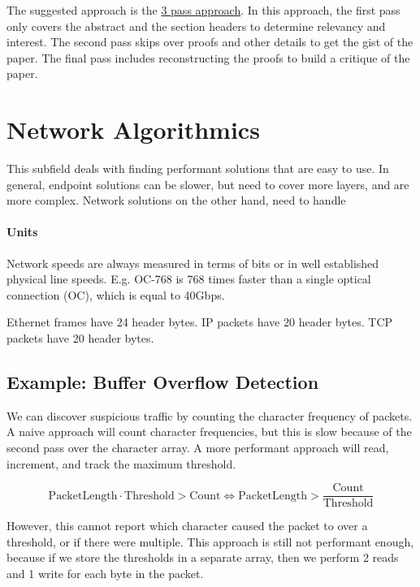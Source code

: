 \documentclass{idc_msc}
\begin{document}
The suggested approach is the \href{http://blizzard.cs.uwaterloo.ca/keshav/home/Papers/data/07/paper-reading.pdf}{3 pass approach}.
In this approach, the first pass only covers the abstract and the section headers to determine relevancy and interest.
The second pass skips over proofs and other details to get the gist of the paper.
The final pass includes reconstructing the proofs to build a critique of the paper.

\section{Network Algorithmics}

This subfield deals with finding performant solutions that are easy to use.
In general, endpoint solutions can be slower, but need to cover more layers, and are more complex.
Network solutions on the other hand, need to handle 

\paragraph{Units}

Network speeds are always measured in terms of bits or in well established physical line speeds.
E.g. OC-768 is 768 times faster than a single optical connection (OC), which is equal to 40Gbps.

Ethernet frames have 24 header bytes.
IP packets have 20 header bytes.
TCP packets have 20 header bytes.

\subsection{Example: Buffer Overflow Detection}

We can discover suspicious traffic by counting the character frequency of packets.
A naive approach will count character frequencies, but this is slow because of the second pass over the character array.
A more performant approach will read, increment, and track the maximum threshold.

\[
  \mathrm{Packet Length} \cdot \mathrm{Threshold} > \mathrm{Count} \iff \mathrm{Packet Length} > \frac{\mathrm{Count}}{\mathrm{Threshold}}
\]

However, this cannot report which character caused the packet to over a threshold, or if there were multiple.
This approach is still not performant enough, because if we store the thresholds in a separate array, then we perform 2 reads and 1 write for each byte in the packet.
\end{document}
